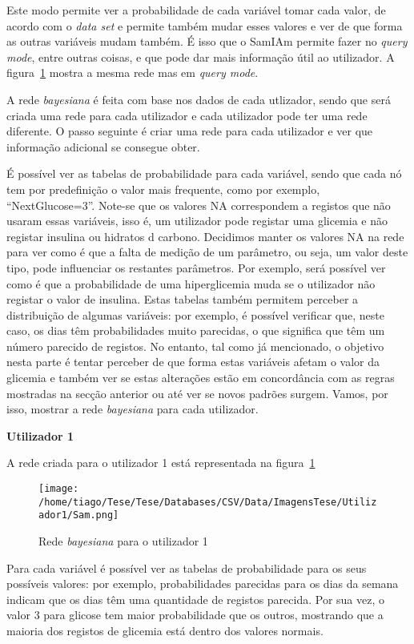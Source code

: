 Este modo permite ver a probabilidade de cada variável tomar cada valor, de acordo com o \textit{data set} e permite também mudar esses valores e ver de que forma as outras variáveis mudam também. É isso que o \ac{SamIAm} permite fazer no \textit{query mode}, entre outras coisas, e que pode dar mais informação útil ao utilizador. A figura~\ref{fig:sam1} mostra a mesma rede mas em \textit{query mode}.

A rede \textit{bayesiana} é feita com base nos dados de cada utlizador, sendo que será criada uma rede para cada utilizador e cada utilizador pode ter uma rede diferente. O passo seguinte é criar uma rede para cada utilizador e ver que informação adicional se consegue obter.

É possível ver as tabelas de probabilidade para cada variável, sendo que cada nó tem por predefinição o valor mais frequente, como por exemplo, ``Next\textunderscore Glucose=3''. Note-se que os valores \ac{NA} correspondem a registos que não usaram essas variáveis, isso é, um utilizador pode registar uma glicemia e não registar insulina ou hidratos d carbono. Decidimos manter os valores \ac{NA} na rede para ver como é que a falta de medição de um parâmetro, ou seja, um valor deste tipo, pode influenciar os restantes parâmetros. Por exemplo, será possível ver como é que a probabilidade de uma hiperglicemia muda se o utilizador não registar o valor de insulina. Estas tabelas também permitem perceber a distribuição de algumas variáveis: por exemplo, é possível verificar que, neste caso, os dias têm probabilidades muito parecidas, o que significa que têm um número parecido de registos. No entanto, tal como já mencionado, o objetivo nesta parte é tentar perceber de que forma estas variáveis afetam o valor da glicemia e também ver se estas alterações estão em concordância com as regras mostradas na secção anterior ou até ver se novos padrões surgem. Vamos, por isso, mostrar a rede \textit{bayesiana} para cada utilizador. 

\textbf{Utilizador 1}

A rede criada para o utilizador 1 está representada na figura~\ref{fig:sam1}

\begin{figure}[H]
\centering
\texttt{[image: /home/tiago/Tese/Tese/Databases/CSV/Data/ImagensTese/Utilizador1/Sam.png]}
\caption{Rede \textit{bayesiana} para o utilizador 1}
\label{fig:sam1}
\end{figure}
Para cada variável é possível ver as tabelas de probabilidade para os seus possíveis valores: por exemplo, probabilidades parecidas para os dias da semana indicam que os dias têm uma quantidade de registos parecida. Por sua vez, o valor 3 para glicose tem maior probabilidade que os outros, mostrando que a maioria dos registos de glicemia está dentro dos valores normais.

